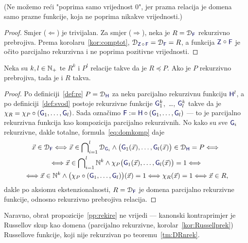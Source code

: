 (Ne možemo reći "poprima samo vrijednost $0$", jer prazna relacija je domena samo prazne funkcije, koja ne poprima nikakve vrijednosti.)

\begin{proof}
    Smjer ($\Leftarrow$) je trivijalan. Za smjer ($\Rightarrow$), neka je $R=\dom{\f F}$ rekurzivno prebrojiva. Prema korolaru~\ref{kor:comptot}, $\dom{\f Z\,\circ\,\f F}=\dom{\f F}=R$, a funkcija $\f Z\mathrel{\raisebox{1pt}{$\circ$}}\f F$ je očito parcijalno rekurzivna i ne poprima pozitivne vrijednosti.
\end{proof}

\begin{lema}[{name=[svedivost čuva rekurzivnu prebrojivost]}]\label{lm:re<re}
Neka su $k,l\in{\mathbb N}_+$ te $R^k$ i $P^l$ relacije takve da je $R\preceq P$. Ako je $P$ rekurzivno prebrojiva, tada je i $R$ takva.
\end{lema}
\begin{proof}
    Po definiciji~\ref{def:re} $P=\dom{\f H}$ za neku parcijalno rekurzivnu funkciju $\f H^l$, a po definiciji~\ref{def:svod} postoje rekurzivne funkcije $\f G_1^k$,~\ldots, $\f G_l^k$ takve da je $\chi_R=\chi_P\circ(\f G_1,\dotsc,\f G_l)$. Sada označimo $\f F:=\f H\circ(\f G_1,\dotsc,\f G_l)$ --- to je parcijalno rekurzivna funkcija kao kompozicija parcijalno rekurzivnih. No kako su sve $\f G_i$ rekurzivne, dakle totalne, formula~\eqref{eq:domkomp} daje
\begin{multline}
    \vec x\in\dom{\f F}\Longleftrightarrow
    \vec x\in\bigcap\nolimits_{i=1}^l\dom{\f G_i}\land
    \bigl(\f G_1(\vec x),\dotsc,\f G_l(\vec x)\bigr)\in\dom{\f H}=P\Longleftrightarrow{}\\
    {}\Longleftrightarrow\vec x\in\bigcap\nolimits_{i=1}^l\N^k\land\chi_P\bigl(\f G_1(\vec x),\dotsc,\f G_l(\vec x)\bigr)=1\Longleftrightarrow{}\\
    {}\Longleftrightarrow\vec x\in\N^k\land\bigl(\chi_P\circ(\f G_1,\dotsc,\f G_l)\bigr)(\vec x)=1\Longleftrightarrow\chi_R(\vec x)=1\Longleftrightarrow\vec x\in R\text,
\end{multline}
dakle po aksiomu ekstenzionalnosti, $R=\dom{\f F}$ je domena parcijalno rekurzivne funkcije, odnosno rekurzivno prebrojiva relacija.
\end{proof}

Naravno, obrat propozicije~\ref{pp:rekire} ne vrijedi --- kanonski kontraprimjer je Russellov skup kao domena (parcijalno rekurzivne, korolar~\ref{kor:Russellprek}) Russellove funkcije, koji nije rekurzivan po teoremu~\ref{tm:DRnrek}.

